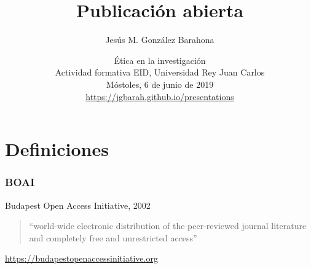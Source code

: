 \documentclass[17pt,aspectratio=169]{beamer}
\begin{document}
\title{Publicación abierta}
\author{Jesús M. González Barahona}

\date{Ética en la investigación \\
  Actividad formativa EID, Universidad Rey Juan Carlos \\
  Móstoles, 6 de junio de 2019\\
{\small \url{https://jgbarah.github.io/presentations}} \\}

\frame{
\maketitle
}




\section{Definiciones}


\begin{frame}
\frametitle{BOAI}

Budapest Open Access Initiative, 2002

\vspace{.5cm}

\begin{quote}
  ``world-wide electronic distribution of the peer-reviewed journal literature and completely free and unrestricted access''
\end{quote}

\begin{flushright}
  {\small \url{https://budapestopenaccessinitiative.org}}
\end{flushright}

\end{frame}
\end{document}
